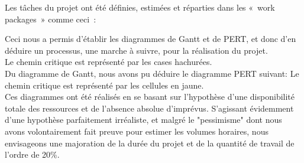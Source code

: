  	\newpage

	Les tâches du projet ont été définies, estimées et réparties dans les « work packages » comme ceci :\\


	\vspace{15pt}

	Ceci nous a permis d'établir les diagrammes de Gantt et de PERT, et donc d’en déduire un processus, une marche à suivre, pour la réalisation du projet.\\

	\vspace{15pt}
	Le chemin critique est représenté par les cases hachurées.\\

	Du diagramme de Gantt, nous avons pu déduire le diagramme PERT suivant:
	\vspace{15pt}
	Le chemin critique est représenté par les cellules en jaune.\\

	Ces diagrammes ont été réalisés en se basant sur l’hypothèse d'une disponibilité totale des ressources et de l'absence absolue d'imprévus. S'agissant évidemment d'une hypothèse parfaitement irréaliste, et malgré le "pessimisme" dont nous avons volontairement fait preuve pour estimer les volumes horaires, nous envisageons une majoration de la durée du projet et de la quantité de travail de l’ordre de 20\%.